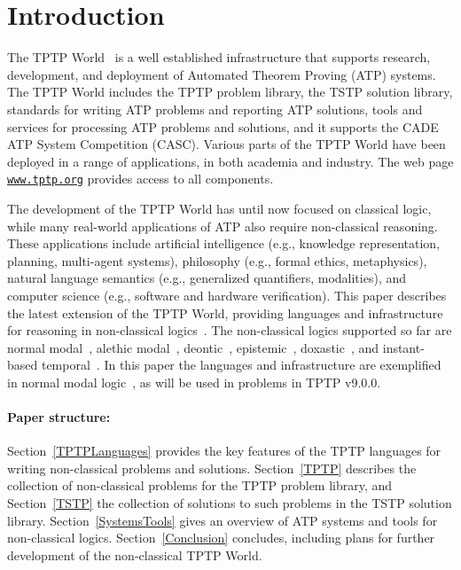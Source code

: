 \documentclass{ceurart}
\begin{document}
\section{Introduction}
\label{Introduction}

The TPTP World~\cite{Sut17} is a well established infrastructure that supports research, 
development, and deployment of Automated Theorem Proving (ATP) systems.
The TPTP World includes the TPTP problem library,
the TSTP solution library,
standards for writing ATP problems and reporting ATP solutions,
tools and services for processing ATP problems and solutions,
and it supports the CADE ATP System Competition (CASC).
Various parts of the TPTP World have been deployed in a range of applications,
in both academia and industry.
The web page \href{https://www.tptp.org}{\tt www.tptp.org} provides access to all 
components.

The development of the TPTP World has until now focused on classical logic, while many 
real-world applications of ATP also require non-classical reasoning. 
These applications include artificial intelligence (e.g., knowledge representation, planning, 
multi-agent systems), philosophy (e.g., formal ethics, metaphysics), natural language semantics 
(e.g., generalized quantifiers, modalities), and computer science (e.g., software and hardware 
verification).
This paper describes the latest extension of the TPTP World, providing languages and
infrastructure for reasoning in non-classical logics~\cite{Pri08,Gob01}.
The non-classical logics supported so far are
normal modal~\cite{FM98},
alethic modal~\cite{Sch06-CPL},
deontic~\cite{Hil71},
epistemic~\cite{vDH15},
doxastic~\cite{Hin62}, and
instant-based temporal~\cite{GR22}.
In this paper the languages and infrastructure are exemplified in normal modal logic~\cite{BBW06},
as will be used in problems in TPTP v9.0.0.

\paragraph{Paper structure:}
Section~\ref{TPTPLanguages} provides the key features of the TPTP languages for writing
non-classical problems and solutions. 
Section~\ref{TPTP} describes the collection of non-classical problems for the TPTP problem library, 
and Section~\ref{TSTP} the collection of solutions to such problems in the TSTP solution library.
Section~\ref{SystemsTools} gives an overview of ATP systems and tools for non-classical logics.
Section~\ref{Conclusion} concludes, including plans for further development of the non-classical
TPTP World.
\end{document}

